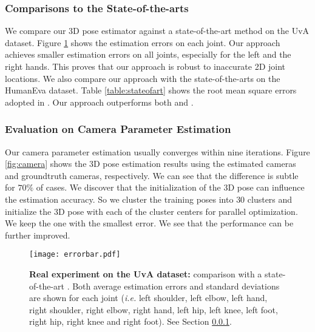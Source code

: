 \documentclass[10pt,twocolumn,letterpaper]{article}
\begin{document}
\subsubsection{Comparisons to the State-of-the-arts}
\label{sec:realexperiment} We compare our 3D pose estimator
against a state-of-the-art method \cite{Ramakrishna} on the UvA
dataset. Figure \ref{fig:CMU_UVA_REAL} shows the estimation errors
on each joint. Our approach achieves smaller estimation errors on
all joints, especially for the left and the right hands. This
proves that our approach is robust to inaccurate 2D joint
locations. We also compare our approach with the state-of-the-arts \cite{SimoSerraCVPR2012} \cite{Daubney} on the HumanEva
dataset. Table \ref{table:stateofart} shows the root mean square
errors adopted in \cite{SimoSerraCVPR2012}. Our approach
outperforms both \cite{SimoSerraCVPR2012} and \cite{Daubney}.


\subsubsection{Evaluation on Camera Parameter Estimation}
\label{sec:exp_camera} Our camera parameter estimation usually
converges within nine iterations. Figure \ref{fig:camera} shows
the 3D pose estimation results using the estimated cameras and
groundtruth cameras, respectively. We can see
that the difference is subtle for $70\%$ of cases. We discover
that the initialization of the 3D pose can influence the
estimation accuracy. So we cluster the training poses into $30$
clusters and initialize the 3D pose with each of the cluster
centers for parallel optimization. We keep the one with the
smallest error. We see that the performance can be further improved.

\begin{figure}
\centering
\texttt{[image: errorbar.pdf]}
\caption{\textbf{Real experiment on the UvA dataset:} comparison
with a state-of-the-art \cite{Ramakrishna}. Both average
estimation errors and standard deviations are shown for each joint
({\em i.e.} left shoulder, left elbow, left hand, right shoulder, right
elbow, right hand, left hip, left knee, left foot, right hip,
right knee and right foot). See Section \ref{sec:realexperiment}.}
\label{fig:CMU_UVA_REAL}
\end{figure}
\end{document}
